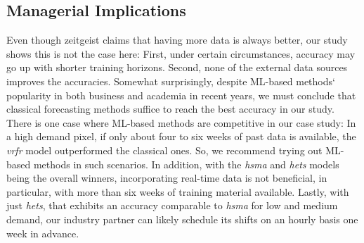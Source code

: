 \subsection{Managerial Implications}
\label{implications}

Even though zeitgeist claims that having more data is always better, our study
    shows this is not the case here:
First, under certain circumstances, accuracy may go up with shorter training
    horizons.
Second, none of the external data sources improves the accuracies.
Somewhat surprisingly, despite ML-based methods` popularity in both business
    and academia in recent years, we must conclude that classical forecasting
    methods suffice to reach the best accuracy in our study.
There is one case where ML-based methods are competitive in our case study:
    In a high demand pixel, if only about four to six weeks of past data is
    available, the \textit{vrfr} model outperformed the classical ones.
So, we recommend trying out ML-based methods in such scenarios.
In addition, with the \textit{hsma} and \textit{hets} models being the overall
    winners, incorporating real-time data is not beneficial, in particular,
    with more than six weeks of training material available.
Lastly, with just \textit{hets}, that exhibits an accuracy comparable to
    \textit{hsma} for low and medium demand, our industry partner can likely
    schedule its shifts on an hourly basis one week in advance.

